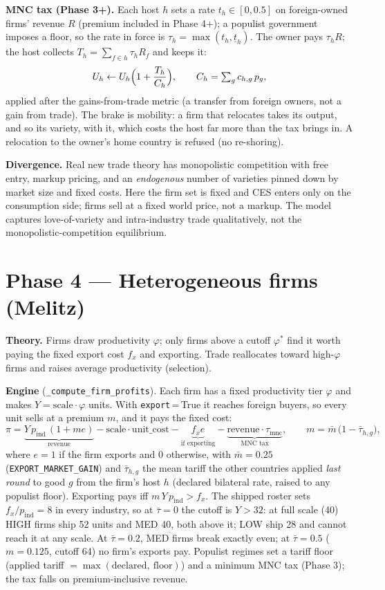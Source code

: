 \documentclass[11pt]{article}
\newcommand{\code}[1]{\texttt{#1}}
\begin{document}
\textbf{MNC tax (Phase 3+).} Each host $h$ sets a rate $t_h \in [0, 0.5]$ on
foreign-owned firms' revenue $R$ (premium included in Phase 4+); a populist
government imposes a floor, so the rate in force is
$\tau_h = \max(t_h, \underline t_h)$. The owner pays $\tau_h R$; the host collects
$T_h = \sum_{f \in h} \tau_h R_f$ and keeps it:
\[
U_h \leftarrow U_h \Bigl(1 + \frac{T_h}{C_h}\Bigr), \qquad
C_h = \textstyle\sum_g c_{h,g}\, p_g ,
\]
applied after the gains-from-trade metric (a transfer from foreign owners, not a
gain from trade). The brake is mobility: a firm that relocates takes its output,
and so its variety, with it, which costs the host far more than the tax brings
in. A relocation to the owner's home country is refused (no re-shoring).

\textbf{Divergence.} Real new trade theory has monopolistic competition with free
entry, markup pricing, and an \emph{endogenous} number of varieties pinned down by
market size and fixed costs. Here the firm set is fixed and CES enters only on the
consumption side; firms sell at a fixed world price, not a markup. The model
captures love-of-variety and intra-industry trade qualitatively, not the
monopolistic-competition equilibrium.

\section{Phase 4 --- Heterogeneous firms (Melitz)}
\textbf{Theory.} Firms draw productivity $\varphi$; only firms above a cutoff
$\varphi^\ast$ find it worth paying the fixed export cost $f_x$ and exporting.
Trade reallocates toward high-$\varphi$ firms and raises average productivity
(selection).

\textbf{Engine} (\code{\_compute\_firm\_profits}). Each firm has a fixed
productivity tier $\varphi$ and makes $Y = \text{scale}\cdot\varphi$ units. With
\code{export}\,=\,True it reaches foreign buyers, so every unit sells at a premium
$m$, and it pays the fixed cost:
\[
\pi = \underbrace{Y\,p_{\text{ind}}\,(1 + m e)}_{\text{revenue}}
- \text{scale}\cdot\text{unit\_cost}
- \underbrace{f_x e}_{\text{if exporting}}
- \underbrace{\text{revenue}\cdot \tau_{\text{mnc}}}_{\text{MNC tax}} ,
\qquad
m = \bar m\,\bigl(1 - \bar\tau_{h,g}\bigr),
\]
where $e = 1$ if the firm exports and $0$ otherwise, with $\bar m = 0.25$ (\code{EXPORT\_MARKET\_GAIN}) and $\bar\tau_{h,g}$ the mean
tariff the other countries applied \emph{last round} to good $g$ from the firm's
host $h$ (declared bilateral rate, raised to any populist floor). Exporting pays
iff $m\,Y\,p_{\text{ind}} > f_x$. The shipped roster sets $f_x/p_{\text{ind}} = 8$
in every industry, so at $\bar\tau = 0$ the cutoff is $Y > 32$: at full scale
(40) HIGH firms ship 52 units and MED 40, both above it; LOW ship 28 and cannot
reach it at any scale. At $\bar\tau = 0.2$, MED firms break exactly even; at
$\bar\tau = 0.5$ ($m = 0.125$, cutoff 64) no firm's exports pay.
Populist regimes set a tariff floor (applied tariff $= \max(\text{declared},\
\text{floor})$) and a minimum MNC tax (Phase 3); the tax falls on
premium-inclusive revenue.
\end{document}
